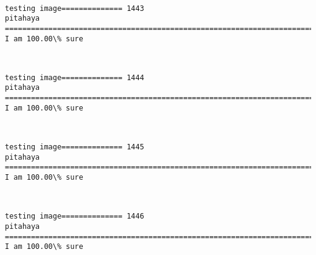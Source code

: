 \documentclass[11pt]{article}
\begin{document}
    \begin{center}
    \end{center}
    { \hspace*{\fill} \\}
    
    \begin{Verbatim}[commandchars=\\\{\}]
testing image============== 1443
pitahaya
============================================================================
I am 100.00\% sure

    \end{Verbatim}

    \begin{center}
    \end{center}
    { \hspace*{\fill} \\}
    
    \begin{Verbatim}[commandchars=\\\{\}]
testing image============== 1444
pitahaya
============================================================================
I am 100.00\% sure

    \end{Verbatim}

    \begin{center}
    \end{center}
    { \hspace*{\fill} \\}
    
    \begin{Verbatim}[commandchars=\\\{\}]
testing image============== 1445
pitahaya
============================================================================
I am 100.00\% sure

    \end{Verbatim}

    \begin{center}
    \end{center}
    { \hspace*{\fill} \\}
    
    \begin{Verbatim}[commandchars=\\\{\}]
testing image============== 1446
pitahaya
============================================================================
I am 100.00\% sure

    \end{Verbatim}
\end{document}
